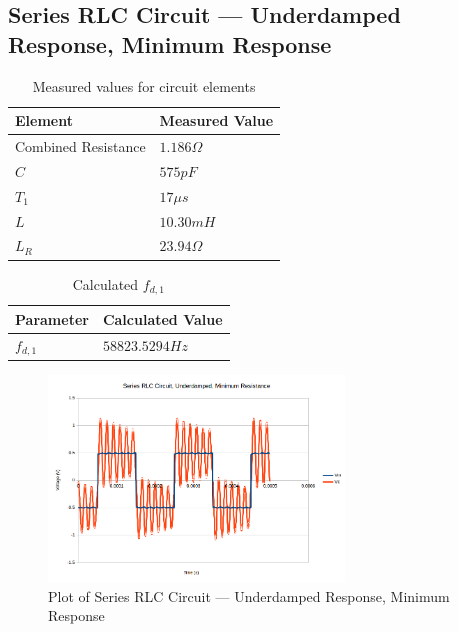 \documentclass[10pt]{article}
\begin{document}
\subsection*{Series RLC Circuit --- Underdamped Response, Minimum Response}
\begin{table}[H]
	\centering
	\begin{tabular}{ll}
		\hline
		\textbf{Element} & \textbf{Measured Value}\\
		\hline
		Combined Resistance & $1.186 \Omega$\\
		$C$ & $575pF$\\
		$T_1$ & $17\mu s$\\
		$L$ & $10.30mH$\\
		$L_R$ & $23.94\Omega$\\
		\hline
	\end{tabular}
	\caption{Measured values for circuit elements}
\end{table}
\begin{table}[H]
	\centering
	\begin{tabular}{ll}
		\hline
		\textbf{Parameter} & \textbf{Calculated Value}\\
		\hline
		$f_{d,1}$ & $58823.5294 Hz$\\
	\end{tabular}
	\caption{Calculated $f_{d,1}$}
\end{table}
\begin{figure}[H]
	\centering
	\includegraphics[width=0.7\textwidth]{RLC_Under_Min.png}
	\caption{Plot of Series RLC Circuit --- Underdamped Response, Minimum Response}
\end{figure}
\end{document}
